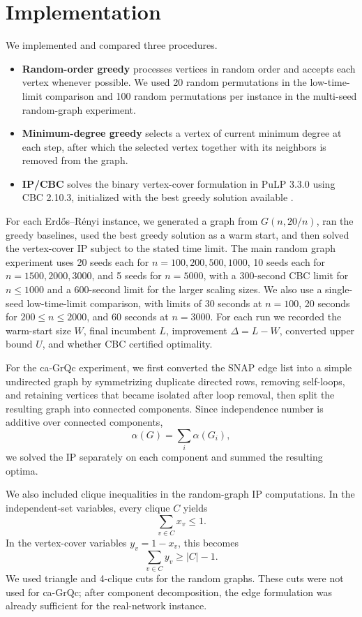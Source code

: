 \documentclass[11pt]{article}
\begin{document}
\section{Implementation}

We implemented and compared three procedures.

\begin{itemize}[leftmargin=*]
\item \textbf{Random-order greedy} processes vertices in random order and
accepts each vertex whenever possible.  We used 20 random permutations in the
low-time-limit comparison and 100 random permutations per instance in the
multi-seed random-graph experiment.
\item \textbf{Minimum-degree greedy} selects a vertex of current minimum
degree at each step, after which the selected vertex together with its neighbors is
removed from the graph.
\item \textbf{IP/CBC} solves the binary vertex-cover formulation in
PuLP 3.3.0 using CBC 2.10.3, initialized with the best greedy solution
available \cite{forrestcbc}.
\end{itemize}

For each Erdős--Rényi instance, we generated a graph from $G(n,20/n)$, ran the
greedy baselines, used the best greedy solution as a warm start, and then
solved the vertex-cover IP subject to the stated time limit.  The main random
graph experiment uses 20 seeds each for $n=100,200,500,1000$, 10 seeds each
for $n=1500,2000,3000$, and 5 seeds for $n=5000$, with a 300-second CBC limit
for $n\le 1000$ and a 600-second limit for the larger scaling sizes.  We also
use a single-seed low-time-limit comparison, with limits of 30 seconds at
$n=100$, 20 seconds for
$200\le n\le 2000$, and 60 seconds at $n=3000$.  For each run we recorded the
warm-start size $W$, final incumbent $L$, improvement $\Delta=L-W$, converted
upper bound $U$, and whether CBC certified optimality.

For the ca-GrQc experiment, we first converted the SNAP edge list into a simple
undirected graph by symmetrizing duplicate directed rows, removing self-loops,
and retaining vertices that became isolated after loop removal, then split the
resulting graph into connected components.  Since independence number is
additive over connected components,
\[
\alpha(G)=\sum_i \alpha(G_i),
\]
we solved the IP separately on each component and summed the resulting optima.

We also included clique inequalities in the random-graph IP computations.  In the
independent-set variables, every clique $C$ yields
\[
\sum_{v\in C}x_v\le 1.
\]
In the vertex-cover variables $y_v=1-x_v$, this becomes
\[
\sum_{v\in C}y_v\ge |C|-1.
\]
We used triangle and 4-clique cuts for the random graphs.  These cuts were not
used for ca-GrQc; after component decomposition, the edge formulation was
already sufficient for the real-network instance.
\end{document}
